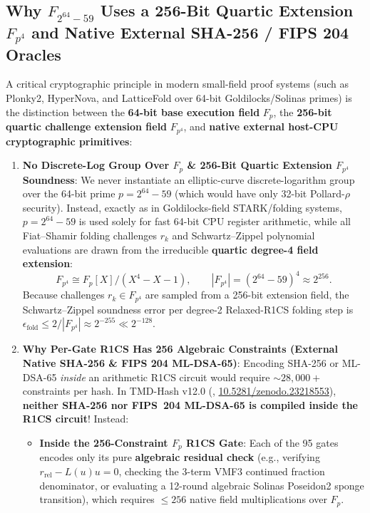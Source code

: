 \documentclass[11pt,a4paper,reqno]{article}
\def\bm#1{#1}%
\def\texttt#1{#1}%
\def\mathcal#1{#1}%
\def\mathbb#1{#1}%
\newcommand{\zenodo}[1]{\href{https://doi.org/10.5281/zenodo.#1}{\texttt{10.5281/\allowbreak zenodo.#1}}}
\theoremstyle{plain}
\theoremstyle{definition}
\theoremstyle{remark}
\numberwithin{equation}{section}
\begin{document}
\subsection{\texorpdfstring{Why $\mathbb{F}_{2^{64}-59}$ Uses a 256-Bit Quartic Extension $\mathbb{F}_{p^4}$ and Native External SHA-256 / FIPS 204 Oracles}{Why F(2^64-59) Uses a 256-Bit Quartic Extension F(p^4) and Native External SHA-256 / FIPS 204 Oracles}}
A critical cryptographic principle in modern small-field proof systems (such as Plonky2, HyperNova, and LatticeFold over 64-bit Goldilocks/Solinas primes) is the distinction between the \textbf{64-bit base execution field} $\mathbb{F}_p$, the \textbf{256-bit quartic challenge extension field} $\mathbb{F}_{p^4}$, and \textbf{native external host-CPU cryptographic primitives}:
\begin{enumerate}[leftmargin=1.8em,itemsep=2pt]
  \item \textbf{No Discrete-Log Group Over $\mathbb{F}_p$ \& 256-Bit Quartic Extension $\mathbb{F}_{p^4}$ Soundness}:
  We never instantiate an elliptic-curve discrete-logarithm group over the 64-bit prime $p = 2^{64}-59$ (which would have only 32-bit Pollard-$\rho$ security). Instead, exactly as in Goldilocks-field STARK/folding systems, $p = 2^{64}-59$ is used solely for fast 64-bit CPU register arithmetic, while all Fiat--Shamir folding challenges $r_k$ and Schwartz--Zippel polynomial evaluations are drawn from the irreducible \textbf{quartic degree-4 field extension}:
  \begin{equation}
    \mathbb{F}_{p^4} \cong \mathbb{F}_p[X] / (X^4 - X - 1), \qquad |\mathbb{F}_{p^4}| = (2^{64}-59)^4 \approx 2^{256}.
    \label{eq:quartic_extension_field}
  \end{equation}
  Because challenges $r_k \in \mathbb{F}_{p^4}$ are sampled from a 256-bit extension field, the Schwartz--Zippel soundness error per degree-2 Relaxed-R1CS folding step is $\epsilon_{\text{fold}} \le 2 / |\mathbb{F}_{p^4}| \approx 2^{-255} \ll 2^{-128}$.
  \item \textbf{Why Per-Gate R1CS Has 256 Algebraic Constraints (External Native SHA-256 \& FIPS 204 ML-DSA-65)}:
  Encoding SHA-256 or ML-DSA-65 \emph{inside} an arithmetic R1CS circuit would require $\sim 28,000+$ constraints per hash. In TMD-Hash v12.0 (\cite{UnmaniTMD12}, \zenodo{23218553}), \textbf{neither SHA-256 nor FIPS~204 ML-DSA-65 is compiled inside the R1CS circuit}! Instead:
  \begin{itemize}[leftmargin=1.5em,itemsep=1pt]
    \item \textbf{Inside the 256-Constraint $\mathbb{F}_p$ R1CS Gate}: Each of the 95 gates encodes only its pure \textbf{algebraic residual check} (e.g., verifying $\bm{r}_{\text{rel}} - \mathcal{L}(\bm{u})\bm{u} = \bm{0}$, checking the 3-term VMF3 continued fraction denominator, or evaluating a 12-round algebraic Solinas Poseidon2 sponge transition), which requires $\le 256$ native field multiplications over $\mathbb{F}_p$.

\end{itemize}
\end{enumerate}
\end{document}
